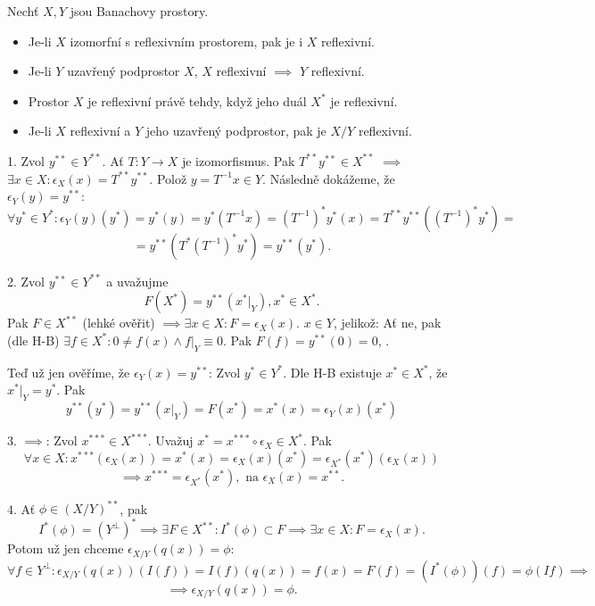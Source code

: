 \documentclass[12pt]{article}					%
\begin{document}
\begin{veta}
	Nechť $X, Y$ jsou Banachovy prostory.

	\begin{itemize}
		\item Je-li $X$ izomorfní s reflexivním prostorem, pak je i $X$ reflexivní.
		\item Je-li $Y$ uzavřený podprostor $X$, $X$ reflexivní $\implies$ $Y$ reflexivní.
		\item Prostor $X$ je reflexivní právě tehdy, když jeho duál $X^*$ je reflexivní.
		\item Je-li $X$ reflexivní a $Y$ jeho uzavřený podprostor, pak je $X / Y$ reflexivní.
	\end{itemize}

	\begin{dukazin}
		1. Zvol $y^{**} \in Y^{**}$. Ať $T: Y \rightarrow X$ je izomorfismus. Pak $T^{**}y^{**} \in X^{**}$ $\implies$ $\exists x \in X: \epsilon_X(x) = T^{**}y^{**}$. Polož $y = T^{-1}x \in Y$. Následně dokážeme, že $\epsilon_Y(y) = y^{**}$:
		$$ \forall y^* \in Y^*: \epsilon_Y(y)(y^*) = y^*(y) = y^*(T^{-1}x) = (T^{-1})^* y^*(x) = T^{**}y^{**} ((T^{-1})^*y^*) = $$
		$$ = y^{**}(T^*(T^{-1})^* y^*) = y^{**}(y^*). $$

		2. Zvol $y^{**} \in Y^{**}$ a uvažujme
		$$ F(X^*) = y^{**}(x^*|_Y), x^* \in X^*. $$
		Pak $F \in X^{**}$ (lehké ověřit) $\implies \exists x \in X: F = \epsilon_X(x)$. $x \in Y$, jelikož: Ať ne, pak (dle H-B) $\exists f \in X^*: 0 ≠ f(x)\land f|_Y ≡ 0$. Pak $F(f) = y^{**}(0) = 0$, \lightning.

		Teď už jen ověříme, že $\epsilon_Y(x) = y^{**}$: Zvol $y^* \in Y^*$. Dle H-B existuje $x^* \in X^*$, že $x^*|_Y = y^*$. Pak
		$$ y^{**}(y^*) = y^{**}(x|_Y) = F(x^*) = x^*(x) = \epsilon_Y (x) (x^*) $$

		3. $\implies$: Zvol $x^{***} \in X^{***}$. Uvažuj $x^* = x^{***}\circ \epsilon_X \in X^*$. Pak
		$$ \forall x \in X: x^{***}(\epsilon_X(x)) = x^*(x) = \epsilon_X(x)(x^*) = \epsilon_{X^*}(x^*)(\epsilon_X(x)) $$
		$$ \implies x^{***} = \epsilon_{X^*}(x^*), \text{ na } \epsilon_X(x) = x^{**}. $$
		
		4. Ať $\phi \in (X / Y)^{**}$, pak
		$$ I^*(\phi) = (Y^\perp)^* \implies \exists F \in X^{**}: I^*(\phi) \subset F \implies \exists x \in X: F = \epsilon_X(x). $$
		Potom už jen chceme $\epsilon_{X / Y}(q(x)) = \phi$:
		$$ \forall f \in Y^\perp: \epsilon_{X / Y}(q(x))(I(f)) = I(f)(q(x)) = f(x) = F(f) = (I^*(\phi))(f) = \phi(I f) \implies $$
		$$ \implies \epsilon_{X / Y}(q(x)) = \phi. $$
	\end{dukazin}
\end{veta}
\end{document}
